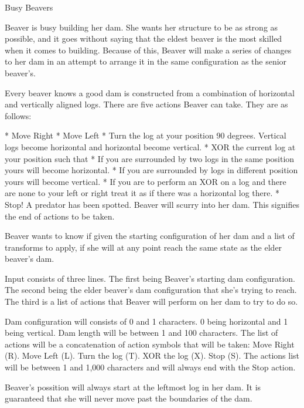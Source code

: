 \begin{problem}{Busy Beavers}

Beaver is busy building her dam. She wants her structure to be as strong as possible, and it goes without saying that the eldest beaver is the most skilled when it comes to building. Because of this, Beaver will make a series of changes to her dam in an attempt to arrange it in the same configuration as the senior beaver’s.

Every beaver knows a good dam is constructed from a combination of horizontal and vertically aligned logs. There are five actions Beaver can take. They are as follows:

	* Move Right
	* Move Left
	* Turn the log at your position 90 degrees. Vertical logs become horizontal and horizontal become vertical.
	* XOR the current log at your position such that
		* If you are surrounded by two logs in the same position yours will become horizontal.
		* If you are surrounded by logs in different position yours will become vertical.
		* If you are to perform an XOR on a log and there are none to your left or right treat it as if there was a horizontal log there.
	* Stop! A predator has been spotted. Beaver will scurry into her dam. This signifies the end of actions to be taken.

Beaver wants to know if given the starting configuration of her dam and a list of transforms to apply, if she will at any point reach the same state as the elder beaver’s dam.

\end{problem}

\begin{formalin}
Input consists of three lines. The first being Beaver’s starting dam configuration. The second being the elder beaver’s dam configuration that she’s trying to reach. The third is a list of actions that Beaver will perform on her dam to try to do so.

Dam configuration will consists of 0 and 1 characters. 0 being horizontal and 1 being vertical. Dam length will be between 1 and 100 characters. The list of actions will be a concatenation of action symbols that will be taken: Move Right (R). Move Left (L). Turn the log (T). XOR the log (X). Stop (S). The actions list will be between 1 and 1,000 characters and will always end with the Stop action.

Beaver's possition will always start at the leftmost log in her dam. It is guaranteed that she will never move past the boundaries of the dam.
\end{formalin}

